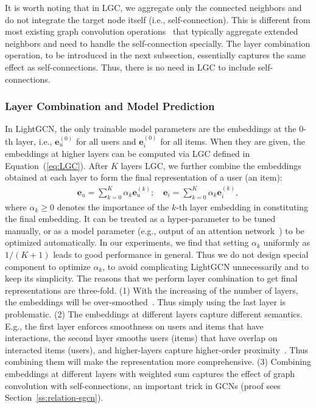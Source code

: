 It is worth noting that in LGC, we aggregate only the connected neighbors and do not integrate the target node itself (i.e., self-connection). This is different from most existing graph convolution operations~\cite{NGCF,GCN,GAT,GraphSAGE, BGNN} that typically aggregate extended neighbors and need to handle the self-connection specially. 
The layer combination operation, to be introduced in the next subsection, essentially captures the same effect as self-connections. Thus, there is no need in LGC to include self-connections. 

\subsubsection{Layer Combination and Model Prediction} In LightGCN, the only trainable model parameters are the embeddings at the 0-th layer, i.e., $\textbf{e}_{u}^{(0)}$ for all users and  $\textbf{e}_{i}^{(0)}$ for all items. When they are given, the embeddings at higher layers can be computed via LGC defined in Equation~(\ref{eq:LGC}). 
After $K$ layers LGC, we further combine the embeddings obtained at each layer to form the final representation of a user (an item):
\begin{equation}
\begin{aligned}
    \textbf{e}_{u} = \sum_{k=0}^K \alpha_k \textbf{e}_u^{(k)}; \quad \textbf{e}_{i} = \sum_{k=0}^K \alpha_k \textbf{e}_i^{(k)},
\end{aligned}
\end{equation}
where $\alpha_k \geq 0$ denotes the importance of the $k$-th layer embedding in constituting the final embedding. 
It can be treated as a hyper-parameter to be tuned manually, or as a model parameter (e.g., output of an attention network~\cite{ACF}) to be optimized automatically. In our experiments, we find that setting $\alpha_k$ uniformly as $1 / (K+1)$ leads to good performance in general. Thus we do not design special component to optimize $\alpha_k$, to avoid complicating LightGCN unnecessarily and to keep its simplicity.  
The reasons that we perform layer combination to get final representations are three-fold. (1) With the increasing of the number of layers, the embeddings will be over-smoothed~\cite{DeepInsights}. Thus simply using the last layer is problematic. (2) The embeddings at different layers capture different semantics. E.g., the first layer enforces smoothness on users and items that have interactions, the second layer smooths users (items) that have overlap on interacted items (users), and higher-layers capture higher-order proximity~\cite{NGCF}. Thus combining them will make the representation more comprehensive. (3) Combining embeddings at different layers with weighted sum captures the effect of graph convolution with self-connections, an important trick in GCNs (proof sees Section~\ref{ss:relation-sgcn}).

